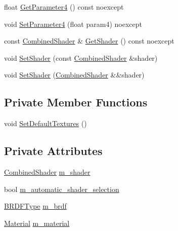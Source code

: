 \begin{DoxyCompactItemize}
float \hyperlink{structmage_1_1_shaded_material_a29197cc34b46b5b7bcd772dff7a894b6}{Get\+Parameter4} () const noexcept
\item 
void \hyperlink{structmage_1_1_shaded_material_ac96ba1f979b75f973f3500f4cbd7e683}{Set\+Parameter4} (float param4) noexcept
\item 
const \hyperlink{structmage_1_1_combined_shader}{Combined\+Shader} \& \hyperlink{structmage_1_1_shaded_material_a1d1affd63d0a2dd8543a10600a267e0b}{Get\+Shader} () const noexcept
\item 
void \hyperlink{structmage_1_1_shaded_material_a65646872fce0961e7ac346be162e89ec}{Set\+Shader} (const \hyperlink{structmage_1_1_combined_shader}{Combined\+Shader} \&shader)
\item 
void \hyperlink{structmage_1_1_shaded_material_ae1c0fe052ef1cfb3c65ddf1ad9de8abb}{Set\+Shader} (\hyperlink{structmage_1_1_combined_shader}{Combined\+Shader} \&\&shader)
\end{DoxyCompactItemize}
\subsection*{Private Member Functions}
\begin{DoxyCompactItemize}
\item 
void \hyperlink{structmage_1_1_shaded_material_afbd4b9d4a2f348124c08c005a712477d}{Set\+Default\+Textures} ()
\end{DoxyCompactItemize}
\subsection*{Private Attributes}
\begin{DoxyCompactItemize}
\item 
\hyperlink{structmage_1_1_combined_shader}{Combined\+Shader} \hyperlink{structmage_1_1_shaded_material_a712d07ac1995ff592bbb8ab20a294270}{m\+\_\+shader}
\item 
bool \hyperlink{structmage_1_1_shaded_material_a744f6e4c0318f29f343039d6be072b66}{m\+\_\+automatic\+\_\+shader\+\_\+selection}
\item 
\hyperlink{namespacemage_ae7a7a03a7b34d7e2689689bb8295cd38}{B\+R\+D\+F\+Type} \hyperlink{structmage_1_1_shaded_material_a59a4b0ecb6ab1d60a285e0f1f69b5e36}{m\+\_\+brdf}
\item 
\hyperlink{structmage_1_1_material}{Material} \hyperlink{structmage_1_1_shaded_material_a319e1ca2103c50f84ce0605b08bd34b4}{m\+\_\+material}
\end{DoxyCompactItemize}


